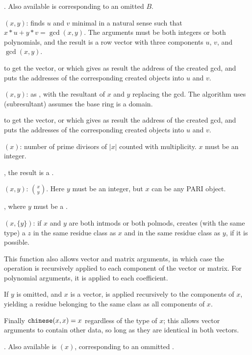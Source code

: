 . Also available is  corresponding
to an omitted $B$.

$(x,y)$: finds $u$ and $v$ minimal in a
natural sense such that $x*u+y*v=\gcd(x,y)$. The arguments
must be both integers or both polynomials, and the result is a
row vector with three components $u$, $v$, and $\gcd(x,y)$.

 to get the vector, or 
which gives as result the address of the created gcd, and puts
the addresses of the corresponding created objects into $u$ and $v$.

$(x,y)$: as , with the resultant of $x$ and
$y$ replacing the gcd.  The algorithm uses
(subresultant) assumes the base ring is a domain.

 to get the vector, or 
which gives as result the address of the created gcd, and puts the
addresses of the corresponding created objects into $u$ and $v$.

$(x)$: number of prime divisors of $|x|$ counted with
multiplicity. $x$ must be an integer.

, the result is a .

$(x,y)$:  $\binom{x}{y}$.
Here $y$ must be an integer, but $x$ can be any PARI object.

, where $y$ must be a .

$(x,\{y\})$: if $x$ and $y$ are both intmods or both
polmods, creates (with the same type) a $z$ in the same residue class
as $x$ and in the same residue class as $y$, if it is possible.

This function also allows vector and matrix arguments, in which case the
operation is recursively applied to each component of the vector or matrix.
For polynomial arguments, it is applied to each coefficient.

If $y$ is omitted, and $x$ is a vector,  is applied recursively
to the components of $x$, yielding a residue belonging to the same class as all
components of $x$.

Finally ${\tt chinese}(x,x) = x$ regardless of the type of $x$; this allows
vector arguments to contain other data, so long as they are identical in both
vectors.

. Also available is $(x)$, corresponding to an
ommitted .

